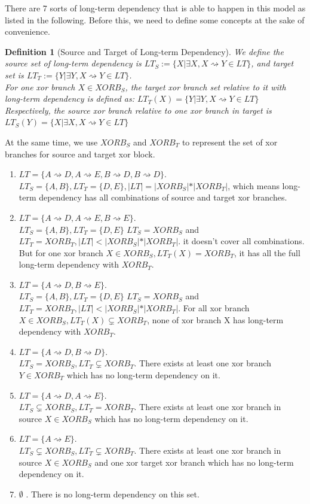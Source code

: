 \documentclass[]{article}
\newtheorem{mydef}{Definition}[section]
\begin{document}
There are 7 sorts of long-term dependency that is able to happen in this model as listed in the following. Before this, we need to define some concepts at the sake of convenience.
\begin{mydef}[Source and Target of Long-term Dependency]
	We define the source set of long-term dependency is  $LT_S:= \{X \vert \exists X, X\rightsquigarrow Y  \in LT \} $, and target set is $LT_T:= \{Y \vert \exists Y, X\rightsquigarrow Y \in LT \} $. \\
	For one xor branch $X \in XORB_S$, the target xor branch set relative to it with long-term dependency is defined as:
	$ LT_T(X)= \{Y \vert \exists Y, X\rightsquigarrow Y \in LT \}$
	Respectively, the source xor branch relative to one xor branch in target is
	$ LT_S(Y)= \{X \vert \exists X, X\rightsquigarrow Y \in LT \}$
\end{mydef}
At the same time, we use $XORB_S $ and $XORB_T$ to represent the set of xor branches for source and target xor block. 
\begin{enumerate}
	\item $LT=\{ A\rightsquigarrow D, A\rightsquigarrow E, B\rightsquigarrow D, B\rightsquigarrow D\}$. \\
	$LT_S = \{A,B\}, LT_T=\{D,E\}, \vert LT \vert = \vert XORB_S \vert * \vert XORB_T \vert  $, which means long-term dependency has all combinations of source and target xor branches. 
	\item $LT=\{ A\rightsquigarrow D, A\rightsquigarrow E, B\rightsquigarrow E\}. $\\
	$LT_S = \{A,B\}, LT_T=\{D,E\}$
	$LT_S = XORB_S $ and $LT_T = XORB_T, \vert LT \vert < \vert XORB_S \vert * \vert XORB_T \vert $. it doesn't cover all combinations. But for one xor branch $X \in XORB_S, LT_T(X)= XORB_T$, it has all the full long-term dependency with $XORB_T$. 
	\item $LT=\{ A\rightsquigarrow D, B\rightsquigarrow E\}. $\\
	$LT_S = \{A,B\}, LT_T=\{D,E\}$
	$LT_S = XORB_S $ and $LT_T = XORB_T, \vert LT \vert < \vert XORB_S \vert * \vert XORB_T \vert $. For all xor branch $X \in XORB_S, LT_T(X) \subsetneq XORB_T$, none of xor branch X has long-term dependency with $XORB_T$.
	\item $LT=\{ A\rightsquigarrow D, B\rightsquigarrow D\}.$ \\
	$LT_S = XORB_S ,  LT_T \subsetneq XORB_T$. There exists at least one xor branch $Y \in XORB_T$ which has no long-term dependency on it.
	\item $LT=\{ A\rightsquigarrow D, A\rightsquigarrow E\}.$ \\
	$LT_S \subsetneq XORB_S ,  LT_T = XORB_T$.
	There exists at least one xor branch in source $X \in XORB_S$ which has no long-term dependency on it.
	\item $LT=\{ A\rightsquigarrow E\}. $\\
	$LT_S \subsetneq XORB_S ,  LT_T \subsetneq XORB_T$.
	There exists at least one xor branch in source $X \in XORB_S$  and one xor target xor branch which has no long-term dependency on it.
	\item $ \emptyset$ . There is no long-term dependency on this set. 
\end{enumerate}
\end{document}
